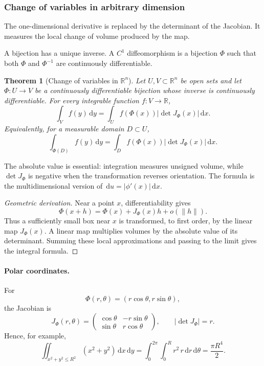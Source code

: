 \documentclass[11pt]{article}
\newcommand{\R}{\mathbb{R}}
\newcommand{\dd}{\,\mathrm{d}}
\theoremstyle{definition}
\theoremstyle{plain}
\newtheorem{theorem}[definition]{Theorem}
\theoremstyle{remark}
\begin{document}
\subsubsection*{Change of variables in arbitrary dimension}

The one-dimensional derivative is replaced by the determinant of the
Jacobian. It measures the local change of volume produced by the map.

A bijection has a unique inverse. A $C^1$ diffeomorphism is a bijection
$\Phi$ such that both $\Phi$ and $\Phi^{-1}$ are continuously differentiable.

\begin{theorem}[Change of variables in $\R^n$]
Let $U,V\subset\R^n$ be open sets and let
$\Phi:U\to V$ be a continuously differentiable bijection whose inverse is
continuously differentiable. For every integrable function $f:V\to\R$,
\[
\boxed{
\int_V f(y)\dd y
=\int_U f(\Phi(x))\left|\det J_\Phi(x)\right|\dd x.}
\]
Equivalently, for a measurable domain $D\subset U$,
\[
\boxed{
\int_{\Phi(D)} f(y)\dd y
=\int_D f(\Phi(x))\left|\det J_\Phi(x)\right|\dd x.}
\]
\end{theorem}

The absolute value is essential: integration measures unsigned volume, while
$\det J_\Phi$ is negative when the transformation reverses orientation. The
formula is the multidimensional version of
$\dd u=|\phi'(x)|\dd x$.

\begin{proof}[Geometric derivation]
Near a point $x$, differentiability gives
\[
\Phi(x+h)=\Phi(x)+J_\Phi(x)h+o(\|h\|).
\]
Thus a sufficiently small box near $x$ is transformed, to first order, by the
linear map $J_\Phi(x)$. A linear map multiplies volumes by the absolute value
of its determinant. Summing these local approximations and passing to the
limit gives the integral formula.
\end{proof}

\paragraph{Polar coordinates.}
For
\[
\Phi(r,\theta)=(r\cos\theta,r\sin\theta),
\]
the Jacobian is
\[
J_\Phi(r,\theta)=
\begin{pmatrix}
\cos\theta&-r\sin\theta\\
\sin\theta&r\cos\theta
\end{pmatrix},
\qquad
|\det J_\Phi|=r.
\]
Hence, for example,
\[
\iint_{x^2+y^2\le R^2}(x^2+y^2)\dd x\dd y
=\int_0^{2\pi}\int_0^R r^2\,r\dd r\dd\theta
=\frac{\pi R^4}{2}.
\]
\end{document}
